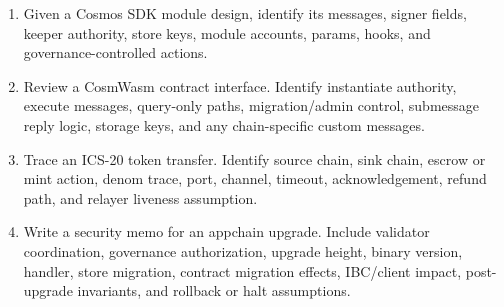 \begin{enumerate}
\item Given a Cosmos SDK module design, identify its messages, signer fields, keeper authority, store keys, module accounts, params, hooks, and governance-controlled actions.

\item Review a CosmWasm contract interface. Identify instantiate authority, execute messages, query-only paths, migration/admin control, submessage reply logic, storage keys, and any chain-specific custom messages.

\item Trace an ICS-20 token transfer. Identify source chain, sink chain, escrow or mint action, denom trace, port, channel, timeout, acknowledgement, refund path, and relayer liveness assumption.

\item Write a security memo for an appchain upgrade. Include validator coordination, governance authorization, upgrade height, binary version, handler, store migration, contract migration effects, IBC/client impact, post-upgrade invariants, and rollback or halt assumptions.
\end{enumerate}
